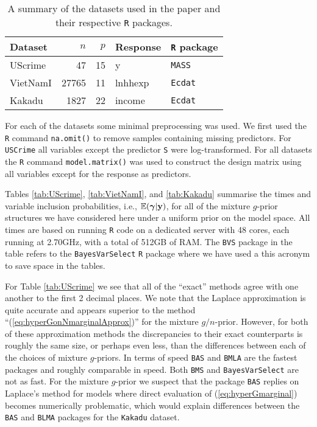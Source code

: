\documentclass[12pt]{article}
\def\vectorfontone{\bf}
\def\vectorfonttwo{\boldsymbol}
\def\vy{{\vectorfontone y}}                      %
\def\vgamma{{\vectorfonttwo \gamma}}             %
\def\bE{{\mathbb E}}                             %
\begin{document}
\begin{table}[h]
	\begin{center}
\begin{tabular}{l|r|r|l|l}
Dataset	& $n$ & $p$ & Response & {\tt R} package \\ 
	\hline 
UScrime 	& 47 & 15 & y & {\tt MASS} \\  
VietNamI	& 27765 & 11 & lnhhexp & {\tt Ecdat}  \\ 
Kakadu	& 1827 & 22 & income & {\tt Ecdat}   \\  
\end{tabular} 
	\end{center}
\caption{A summary of the datasets used in the paper and their respective {\tt R} packages.}
\label{tab:datasets}
\end{table}
 
For each of the datasets some minimal preprocessing was used.
We first used the {\tt R} command {\tt na.omit()} to remove samples containing missing predictors. 
For {\tt USCrime} all variables except the predictor {\tt S} were log-transformed. For all datasets
the {\tt R} command {\tt model.matrix()} was used to construct the design matrix using all 
variables except for the response as predictors.

Tables \ref{tab:UScrime}, \ref{tab:VietNamI}, and \ref{tab:Kakadu} summarise the times and variable 
inclusion probabilities, i.e., $\bE(\vgamma|\vy)$, for all of the mixture $g$-prior structures we have considered here under a uniform prior
on the model space.  
All times are based on running {\tt R} code on a dedicated server with 48 cores,
each running at 2.70GHz, with a total of 512GB of RAM.
 The {\tt BVS} package in the table refers to the {\tt BayesVarSelect} {\tt R} package where we have used a this acronym to save space in the tables. 

For Table \ref{tab:UScrime} we see that all of the ``exact'' methods agree with one another to the first 2 decimal 
places. We note that the Laplace approximation is quite accurate and appears superior to  the method
``(\ref{eq:hyperGonNmarginalApprox})'' for the mixture $g/n$-prior. However, for both of these approximation
methods the discrepancies to their exact counterparts is roughly the same size, or perhaps even less, than
the differences between each of the choices of mixture $g$-priors. In terms of speed {\tt BAS} and {\tt BMLA} are
the fastest packages and roughly comparable in speed. Both {\tt BMS} and {\tt BayesVarSelect} are not as fast.
For the mixture $g$-prior we suspect that the package {\tt BAS} replies on Laplace's method for models
where direct evaluation of (\ref{eq:hyperGmarginal}) becomes numerically problematic, which would explain
differences between the {\tt BAS} and {\tt BLMA} packages for the {\tt Kakadu} dataset.
\end{document}
